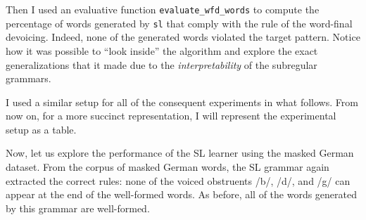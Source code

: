 Then I used an evaluative function \texttt{evaluate\_wfd\_words} to compute the percentage of words generated by \texttt{sl} that comply with the rule of the word-final devoicing.
Indeed, none of the generated words violated the target pattern.
Notice how it was possible to ``look inside'' the algorithm and explore the exact generalizations that it made due to the \emph{interpretability} of the subregular grammars.

\begin{table}[h!]
\centering
{}
\caption{SL learning of the word-final devoicing; abstract representation.}
\end{table}

I used a similar setup for all of the consequent experiments in what follows.
From now on, for a more succinct representation, I will represent the experimental setup as a table.


Now, let us explore the performance of the SL learner using the masked German dataset.
From the corpus of masked German words, the SL grammar again extracted the correct rules: none of the voiced obstruents /b/, /d/, and /g/ can appear at the end of the well-formed words.
As before, all of the words generated by this grammar are well-formed.

